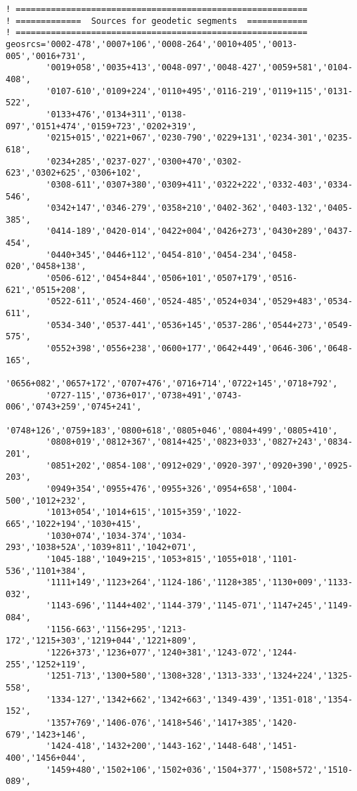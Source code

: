 \documentclass{report}
\begin{document}
\begin{verbatim}
! ==========================================================
! =============  Sources for geodetic segments  ============
! ==========================================================
geosrcs='0002-478','0007+106','0008-264','0010+405','0013-005','0016+731',
        '0019+058','0035+413','0048-097','0048-427','0059+581','0104-408',
        '0107-610','0109+224','0110+495','0116-219','0119+115','0131-522',
        '0133+476','0134+311','0138-097','0151+474','0159+723','0202+319',
        '0215+015','0221+067','0230-790','0229+131','0234-301','0235-618',
        '0234+285','0237-027','0300+470','0302-623','0302+625','0306+102',
        '0308-611','0307+380','0309+411','0322+222','0332-403','0334-546',
        '0342+147','0346-279','0358+210','0402-362','0403-132','0405-385',
        '0414-189','0420-014','0422+004','0426+273','0430+289','0437-454',
        '0440+345','0446+112','0454-810','0454-234','0458-020','0458+138',
        '0506-612','0454+844','0506+101','0507+179','0516-621','0515+208',
        '0522-611','0524-460','0524-485','0524+034','0529+483','0534-611',
        '0534-340','0537-441','0536+145','0537-286','0544+273','0549-575',
        '0552+398','0556+238','0600+177','0642+449','0646-306','0648-165',
        '0656+082','0657+172','0707+476','0716+714','0722+145','0718+792',
        '0727-115','0736+017','0738+491','0743-006','0743+259','0745+241',
        '0748+126','0759+183','0800+618','0805+046','0804+499','0805+410',
        '0808+019','0812+367','0814+425','0823+033','0827+243','0834-201',
        '0851+202','0854-108','0912+029','0920-397','0920+390','0925-203',
        '0949+354','0955+476','0955+326','0954+658','1004-500','1012+232',
        '1013+054','1014+615','1015+359','1022-665','1022+194','1030+415',
        '1030+074','1034-374','1034-293','1038+52A','1039+811','1042+071',
        '1045-188','1049+215','1053+815','1055+018','1101-536','1101+384',
        '1111+149','1123+264','1124-186','1128+385','1130+009','1133-032',
        '1143-696','1144+402','1144-379','1145-071','1147+245','1149-084',
        '1156-663','1156+295','1213-172','1215+303','1219+044','1221+809',
        '1226+373','1236+077','1240+381','1243-072','1244-255','1252+119',
        '1251-713','1300+580','1308+328','1313-333','1324+224','1325-558',
        '1334-127','1342+662','1342+663','1349-439','1351-018','1354-152',
        '1357+769','1406-076','1418+546','1417+385','1420-679','1423+146',
        '1424-418','1432+200','1443-162','1448-648','1451-400','1456+044',
        '1459+480','1502+106','1502+036','1504+377','1508+572','1510-089',

\end{verbatim}
\end{document}
